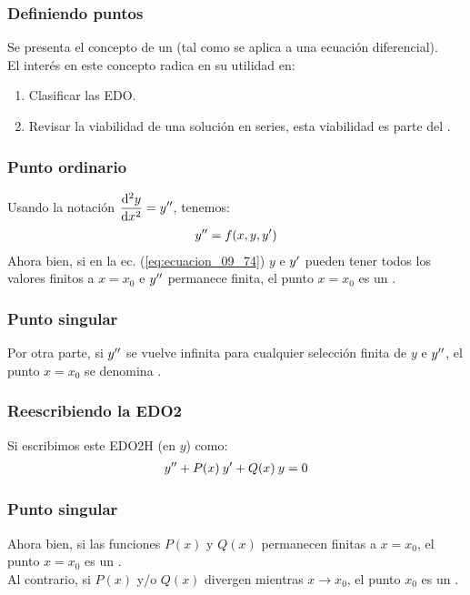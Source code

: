 \documentclass[12pt]{beamer}
\begin{document}
\begin{frame}
\frametitle{Definiendo puntos}
Se presenta el concepto de un  (tal como se aplica a una ecuación diferencial).
\\
\bigskip
\pause
El interés en este concepto radica en su utilidad en:
\pause
{}
\begin{enumerate}[<+->]
\item Clasificar las EDO.
\item Revisar la viabilidad de una solución en series, esta viabilidad es parte del .
\end{enumerate}
\end{frame}
\begin{frame}
\frametitle{Punto ordinario}
Usando la notación $\displaystyle \dv[2]{y}{x} = {y}^{\prime \prime}$, tenemos:
\pause
\begin{align}
{y}^{\prime \prime} = f (x, y, {y}^{\prime})
\label{eq:ecuacion_09_74}
\end{align}
\pause
Ahora bien, si en la ec. (\ref{eq:ecuacion_09_74}) $y$ e ${y}^{\prime}$ pueden tener todos los valores finitos a $x = x_{0}$ e ${y}^{\prime \prime}$ permanece finita, \pause el punto $x = x_{0}$ es un .
\end{frame}
\begin{frame}
\frametitle{Punto singular}
Por otra parte, si ${y}^{\prime \prime}$ se vuelve infinita para cualquier selección finita de $y$ e ${y}^{\prime \prime}$, \pause el punto $x = x_{0}$ se denomina .
\end{frame}
\begin{frame}
\frametitle{Reescribiendo la EDO2}
Si escribimos este EDO2H (en $y$) como:
\pause
\begin{align}
{y}^{\prime \prime} + P (x) \: {y}^{\prime} + Q (x) \: y = 0
\label{eq:ecuacion_09_75}
\end{align}
\end{frame}
\begin{frame}
\frametitle{Punto singular}
Ahora bien, si las funciones $P (x)$ y $Q (x)$ permanecen finitas a $x = x_{0}$, el punto $x = x_{0}$ es un .
\\
\bigskip
\pause
Al contrario, si $P (x)$ y/o $Q (x)$ divergen mientras $x \to x_{0}$, el punto $x_{0}$ es un .
\end{frame}
\end{document}
